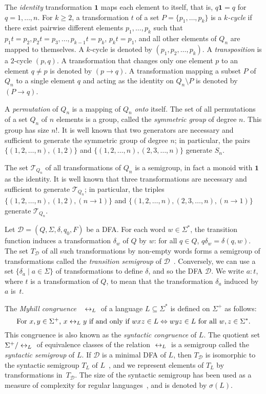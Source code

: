 \documentclass[final]{dmtcs-episciences}
\renewcommand{\ge}{\geqslant}
\newcommand{\Sig}{\Sigma}
\newcommand{\sig}{\sigma}
\newcommand{\cD}{{\mathcal D}}
\newcommand{\cT}{{\mathcal T}}
\newcommand{\one}{{\mathbf 1}}
\newcommand{\lraL}{{\hspace{.1cm}{\leftrightarrow_L} \hspace{.1cm}}}
\theoremstyle{definition}
\theoremstyle{remark}
\begin{document}
The \emph{identity} transformation $\one$ maps  each element to itself, that is, $q\one=q$ for $q=1,\ldots,n$.
For $k\ge 2$,  a
transformation $t$ of a set $P=\{p_1,\dots,p_k\}$ is a \emph{$k$-cycle} if there exist pairwise different elements $p_1,\ldots,p_k$ such that
$p_1t=p_2, p_2t=p_3,\ldots, p_{k-1}t=p_k$,  $p_kt=p_1$, and all other elements of $Q_n$ are mapped to themselves.
A $k$-cycle is denoted by $(p_1,p_2,\ldots,p_k)$.
A \emph{transposition} is a $2$-cycle $(p,q)$.
A transformation that changes only one element $p$ to an element $q\neq p$ is denoted by $(p\to q)$.
A transformation mapping a subset $P$ of $Q_n$ to a single element $q$ and acting as the identity on $Q_n\setminus P$ is denoted by $(P \rightarrow q)$.

A \emph{permutation} of $Q_n$ is a mapping of $Q_n$ \emph{onto} itself. 
The set of all permutations of a set $Q_n$ of $n$ elements is a group, 
called the \emph{symmetric group} of degree $n$. 
This group has size $n!$.
It is well known that  two generators are necessary and sufficient to generate the symmetric group of degree $n$;
 in particular, the pairs $\{(1,2,\ldots, n),(1,2)\}$ and $\{(1,2,\ldots, n),(2,3,\dots,n)\}$ generate $S_n$.


The set $\cT_{Q_n}$ of all transformations of  $Q_n$
is a semigroup, in fact a monoid with $\one$ as the identity. 
It is well known that three transformations are necessary and sufficient to generate  $\cT_{Q_n}$;
in particular,  the triples
 $\{(1,2,\ldots, n),(1,2),(n \rightarrow 1) \}$ and $\{(1,2,\ldots, n),(2,3,\dots,n),(n \rightarrow 1)\}$ generate $\cT_{Q_n}$.

Let $\cD = (Q, \Sig, \delta, q_0, F)$ be a DFA. For each word $w \in \Sig^*$, the transition function induces a transformation $\delta_w$ of $Q$ by  $w$: for all $q \in Q$, 
$q\delta_w = \delta(q, w).$ 
The set $T_{\cD}$ of all such transformations by non-empty words forms a semigroup of transformations called the \emph{transition semigroup} of $\cD$~\cite{Pin97}. 
Conversely, we can use a set  $\{\delta_a \mid a \in \Sig\}$ of transformations to define $\delta$, and so the DFA $\cD$. We write $a\colon t$, where $t$ is a transformation of $Q$, to mean that the transformation $\delta_a$ induced by $a$ is~$t$. 

The \emph{Myhill congruence}~\cite{Myh57} $\lraL$ of a language $L\subseteq \Sig^*$ is defined on $\Sig^+$ as follows:
$$
\mbox{For $x, y \in \Sig^+$, } x \lraL y \mbox{ if and only if } wxz\in L  \Leftrightarrow wyz\in L\mbox { for all } w,z \in\Sig^*.
$$
This congruence is also known as the \emph{syntactic congruence} of $L$.
The quotient set $\Sig^+/ \lraL$ of equivalence classes of the relation $\lraL$ is a semigroup called the \emph{syntactic semigroup} of $L$.
If  $\cD$ is a minimal DFA of $L$, then $T_{\cD}$ is isomorphic to the syntactic semigroup $T_L$ of $L$~\cite{Pin97}, and we represent elements of $T_L$ by transformations in~$T_{\cD}$. 
The size of the syntactic semigroup has been used as a measure of complexity for regular languages~\cite{Brz13,BrYe11,HoKo04}, and is denoted by $\sig(L)$. 
\end{document}
